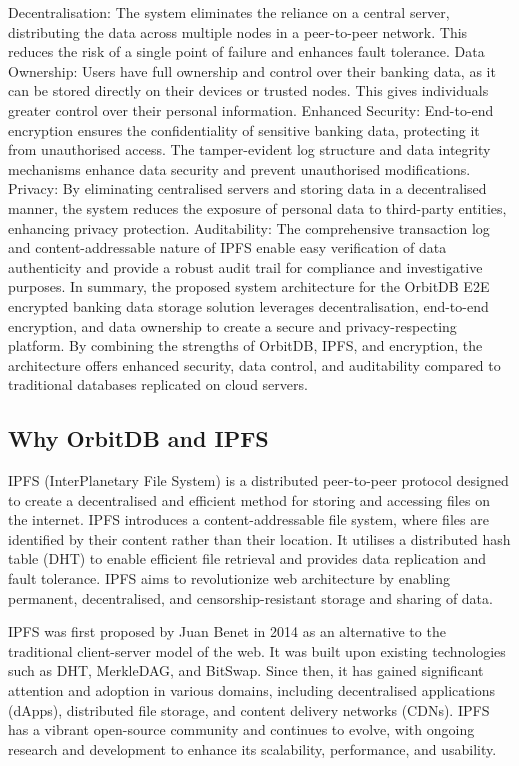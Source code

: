 \documentclass[a4paper,11 pt]{article}
\theoremstyle{definition}
\begin{document}
Decentralisation: The system eliminates the reliance on a central server, distributing the data across multiple nodes in a peer-to-peer network. This reduces the risk of a single point of failure and enhances fault tolerance.
Data Ownership: Users have full ownership and control over their banking data, as it can be stored directly on their devices or trusted nodes. This gives individuals greater control over their personal information.
Enhanced Security: End-to-end encryption ensures the confidentiality of sensitive banking data, protecting it from unauthorised access. The tamper-evident log structure and data integrity mechanisms enhance data security and prevent unauthorised modifications.
Privacy: By eliminating centralised servers and storing data in a decentralised manner, the system reduces the exposure of personal data to third-party entities, enhancing privacy protection.
Auditability: The comprehensive transaction log and content-addressable nature of IPFS enable easy verification of data authenticity and provide a robust audit trail for compliance and investigative purposes.
In summary, the proposed system architecture for the OrbitDB E2E encrypted banking data storage solution leverages decentralisation, end-to-end encryption, and data ownership to create a secure and privacy-respecting platform. By combining the strengths of OrbitDB, IPFS, and encryption, the architecture offers enhanced security, data control, and auditability compared to traditional databases replicated on cloud servers.

\subsection{Why OrbitDB and IPFS}
IPFS (InterPlanetary File System) is a distributed peer-to-peer protocol designed to create a decentralised and efficient method for storing and accessing files on the internet. IPFS introduces a content-addressable file system, where files are identified by their content rather than their location. It utilises a distributed hash table (DHT) to enable efficient file retrieval and provides data replication and fault tolerance. IPFS aims to revolutionize web architecture by enabling permanent, decentralised, and censorship-resistant storage and sharing of data.

IPFS was first proposed by Juan Benet in 2014 as an alternative to the traditional client-server model of the web. It was built upon existing technologies such as DHT, MerkleDAG, and BitSwap. Since then, it has gained significant attention and adoption in various domains, including decentralised applications (dApps), distributed file storage, and content delivery networks (CDNs). IPFS has a vibrant open-source community and continues to evolve, with ongoing research and development to enhance its scalability, performance, and usability.
\end{document}
